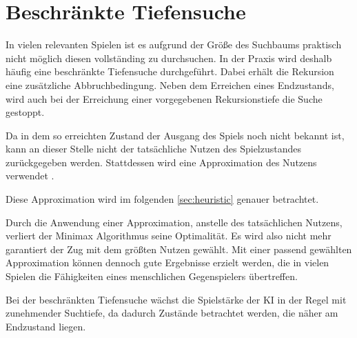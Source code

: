\section{Beschränkte Tiefensuche}

In vielen relevanten Spielen ist es aufgrund der Größe des Suchbaums praktisch nicht möglich diesen vollständing zu
durchsuchen. In der Praxis wird deshalb häufig eine beschränkte Tiefensuche durchgeführt. Dabei erhält die Rekursion
eine zusätzliche Abbruchbedingung. Neben dem Erreichen eines Endzustands, wird auch bei der Erreichung einer
vorgegebenen Rekursionstiefe die Suche gestoppt.

Da in dem so erreichten Zustand der Ausgang des Spiels noch nicht bekannt ist, kann an dieser Stelle nicht der
tatsächliche Nutzen des Spielzustandes zurückgegeben werden. Stattdessen wird eine Approximation des Nutzens verwendet \cite[S.~171]{ai2010russel}.

Diese Approximation wird im folgenden \autoref{sec:heuristic} genauer betrachtet.

Durch die Anwendung einer Approximation, anstelle des tatsächlichen Nutzens, verliert der Minimax Algorithmus seine Optimalität. Es
wird also nicht mehr garantiert der Zug mit dem größten Nutzen gewählt. Mit einer passend gewählten Approximation
können dennoch gute Ergebnisse erzielt werden, die in vielen Spielen die Fähigkeiten eines menschlichen Gegenspielers
übertreffen.

Bei der beschränkten Tiefensuche wächst die Spielstärke der \ac{KI} in der Regel mit zunehmender Suchtiefe, da dadurch Zustände
betrachtet werden, die näher am Endzustand liegen.
